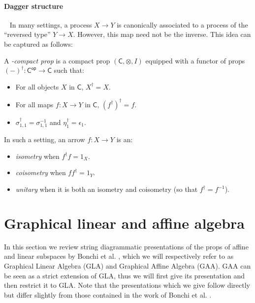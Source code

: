 \paragraph{Dagger structure} \  \newline
In many settings, a process \(X\to Y\) is canonically associated to a process of the ``reversed type'' \(Y\to X \).  However, this map need not be the inverse.  This idea can be captured as follows:
\begin{definition}
  \label{def:dag}
  A {\em \dag-compact prop} is a compact prop \((\mathsf{C}, \otimes, I)\) equipped with a functor of props \( (-)^\dag : \mathsf{C}^\mathsf{op}\to  \mathsf{C} \) such that:
  \begin{itemize}
    \item For all objects \( X \) in \(\mathsf{C}\), \(X^\dag = X\).
    \item For all maps \(f:X\to Y\) in \(\mathsf{C}\),  \( (f^\dag)^\dag=f  \).
    \item \(\sigma_{1,1}^\dag= \sigma_{1,1}^{-1}\) and \(\eta_1^\dag=\epsilon_1\).
  \end{itemize}
  In such a setting, an arrow \(f:X\to Y\) is an:
  \begin{itemize}
    \item {\em isometry} when \(f^\dag  f = 1_X\).
    \item {\em coisometry} when \(f f^\dag = 1_Y\).
    \item {\em unitary} when it is both an isometry and coisometry (so that \(f^\dag = f^{-1}\)).
  \end{itemize}
\end{definition}
\section{Graphical linear and affine algebra}\label{sec:GAA}
In this section we review string diagrammatic presentations of the props of affine and linear subspaces by Bonchi et al. \cite{gla,gaa}, which we will respectively refer to as Graphical Linear Algebra ({\sf GLA})  and Graphical Affine Algebra ({\sf GAA}). {\sf GAA} can be seen as a strict extension of GLA, thus we will first give its presentation and then restrict it to {\sf GLA}. Note that the presentations which we give follow directly but differ slightly from those contained in the work of Bonchi et al. \cite{gla,gaa}.
